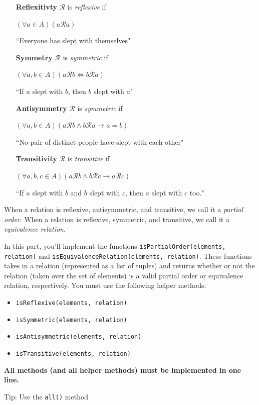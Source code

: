 \documentclass{article}
\begin{document}
    \begin{enumerate}[align=left]
        \item [\textbf{Reflexitivty}] $\mathcal{R}$ is \textit{reflexive} if 

        $(\forall a \in A)(a\mathcal{R}a)$

        ``Everyone has slept with themselves"
        \item [\textbf{Symmetry}] $\mathcal{R}$ is \textit{symmetric} if 

        $(\forall a, b \in A)(a\mathcal{R}b \iff b\mathcal{R}a)$

        ``If $a$ slept with $b$, then $b$ slept with $a$"

        \item [\textbf{Antisymmetry}] $\mathcal{R}$ is \textit{symmetric} if 

        $(\forall a, b\in A)(a\mathcal{R}b \wedge b\mathcal{R}a \rightarrow a=b)$

        ``No pair of distinct people have slept with each other"

        \item [\textbf{Transitivity}] $\mathcal{R}$ is \textit{transitive} if 

        $(\forall a, b, c\in A)(a\mathcal{R}b \wedge b\mathcal{R}c \rightarrow a\mathcal{R}c)$

        ``If $a$ slept with $b$ and $b$ slept with $c$, then $a$ slept with $c$ too."
    \end{enumerate}

    When a relation is reflexive, antisymmetric, and transitive, we call it a \textit{partial order}. When a relation is reflexive, symmetric, and transitive, we call it a \textit{equivalence relation}.

    \vspace{3mm}
    \begin{tcolorbox}[colback=yellow!30]
        In this part, you'll implement the functions \lstinline{isPartialOrder(elements, relation)} and \lstinline{isEquivalenceRelation(elements, relation)}. These functions takes in a relation (represented as a list of tuples) and returns whether or not the relation (taken over the set of elements) is a valid partial order or equivalence relation, respectively. You must use the following helper methods:
        \begin{itemize}
            \item \lstinline{isReflexive(elements, relation)}
            \item \lstinline{isSymmetric(elements, relation)}
            \item \lstinline{isAntisymmetric(elements, relation)}
            \item \lstinline{isTransitive(elements, relation)}
        \end{itemize}
        \textbf{All methods (and all helper methods) must be implemented in one line.}
        
        Tip: Use the \lstinline{all()} method
    \end{tcolorbox}
\end{document}
